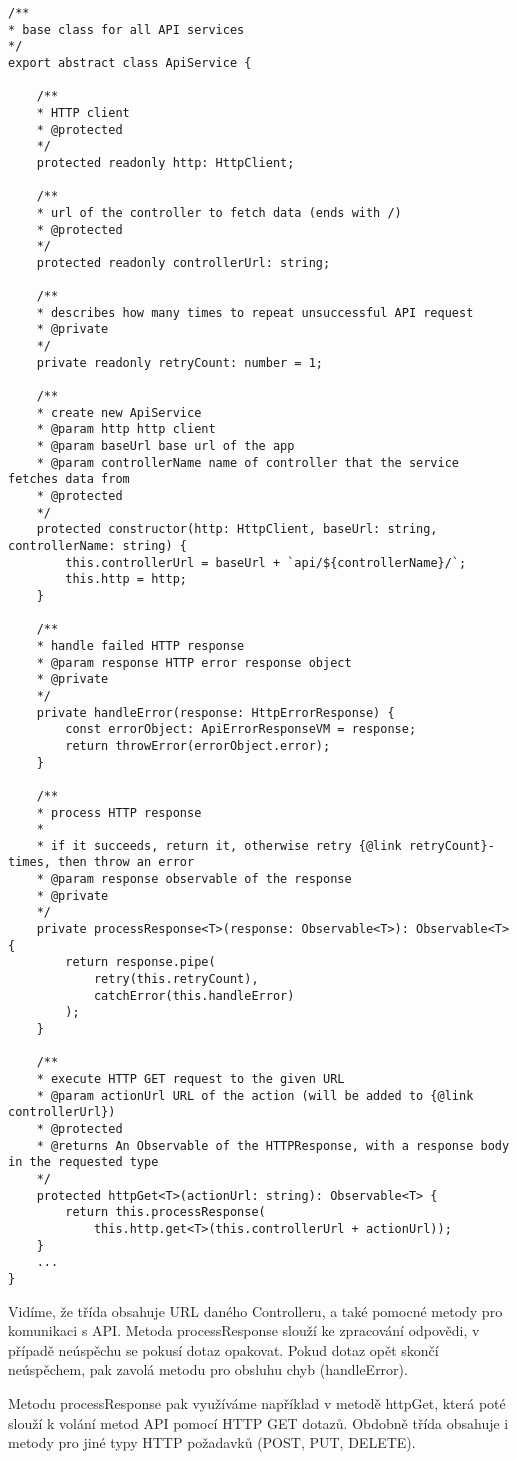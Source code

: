 \begin{lstlisting}
/**
* base class for all API services
*/
export abstract class ApiService {

	/**
	* HTTP client
	* @protected
	*/
	protected readonly http: HttpClient;
	
	/**
	* url of the controller to fetch data (ends with /)
	* @protected
	*/
	protected readonly controllerUrl: string;
	
	/**
	* describes how many times to repeat unsuccessful API request
	* @private
	*/
	private readonly retryCount: number = 1;
	
	/**
	* create new ApiService
	* @param http http client
	* @param baseUrl base url of the app
	* @param controllerName name of controller that the service fetches data from
	* @protected
	*/
	protected constructor(http: HttpClient, baseUrl: string, controllerName: string) {
		this.controllerUrl = baseUrl + `api/${controllerName}/`;
		this.http = http;
	}
	
	/**
	* handle failed HTTP response
	* @param response HTTP error response object
	* @private
	*/
	private handleError(response: HttpErrorResponse) {
		const errorObject: ApiErrorResponseVM = response;
		return throwError(errorObject.error);
	}
	
	/**
	* process HTTP response
	*
	* if it succeeds, return it, otherwise retry {@link retryCount}-times, then throw an error
	* @param response observable of the response
	* @private
	*/
	private processResponse<T>(response: Observable<T>): Observable<T> {
		return response.pipe(
			retry(this.retryCount),
			catchError(this.handleError)
		);
	}
	
	/**
	* execute HTTP GET request to the given URL
	* @param actionUrl URL of the action (will be added to {@link controllerUrl})
	* @protected
	* @returns An Observable of the HTTPResponse, with a response body in the requested type
	*/
	protected httpGet<T>(actionUrl: string): Observable<T> {
		return this.processResponse(
			this.http.get<T>(this.controllerUrl + actionUrl));
	}
	...
}
\end{lstlisting}

Vidíme, že třída obsahuje URL daného Controlleru, a také pomocné metody pro komunikaci s API. Metoda processResponse slouží ke zpracování odpovědi, v případě neúspěchu se pokusí dotaz opakovat. Pokud dotaz opět skončí neúspěchem, pak zavolá metodu pro obsluhu chyb (handleError).

Metodu processResponse pak využíváme například v metodě httpGet, která poté slouží k volání metod API pomocí HTTP GET dotazů. Obdobně třída obsahuje i metody pro jiné typy HTTP požadavků (POST, PUT, DELETE).

